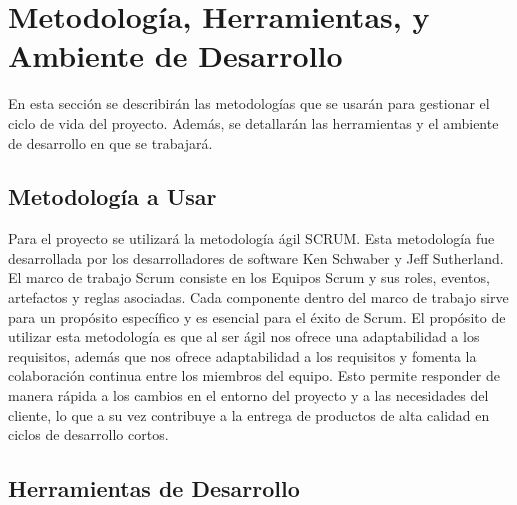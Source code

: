 \section{Metodología, Herramientas, y Ambiente de Desarrollo}
En esta sección se describirán las metodologías que se usarán para gestionar el ciclo de vida del proyecto. Además, se detallarán las herramientas y el ambiente de desarrollo en que se trabajará.
\subsection{Metodología a Usar}
Para el proyecto se utilizará la metodología ágil SCRUM\cite{1}. Esta metodología fue desarrollada por los desarrolladores de software Ken Schwaber y Jeff Sutherland. El marco de trabajo Scrum consiste en los Equipos Scrum y sus roles, eventos, artefactos y reglas asociadas\cite{2}. Cada componente dentro del marco de trabajo sirve para un propósito específico y es esencial para el éxito de Scrum. El propósito de utilizar esta metodología es que al ser ágil nos ofrece una adaptabilidad a los requisitos, además que nos ofrece adaptabilidad a los requisitos y fomenta la colaboración continua entre los miembros del equipo. Esto permite responder de manera rápida a los cambios en el entorno del proyecto y a las necesidades del cliente, lo que a su vez contribuye a la entrega de productos de alta calidad en ciclos de desarrollo cortos.
\subsection{Herramientas de Desarrollo}
